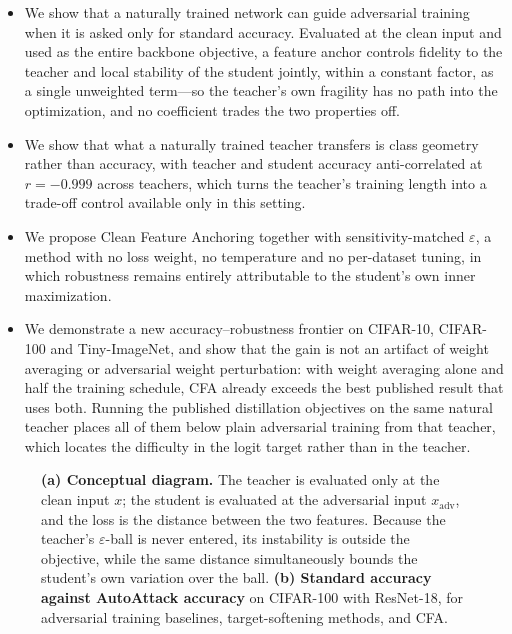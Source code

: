 \begin{itemize}
  \item We show that a naturally trained network can guide adversarial training when it is asked
    only for standard accuracy. Evaluated at the clean input and used as the entire backbone
    objective, a feature anchor controls fidelity to the teacher and local stability of the student
    jointly, within a constant factor, as a single unweighted term---so the teacher's own fragility
    has no path into the optimization, and no coefficient trades the two properties off.

  \item We show that what a naturally trained teacher transfers is class geometry rather than
    accuracy, with teacher and student accuracy anti-correlated at $r = -0.999$ across teachers,
    which turns the teacher's training length into a trade-off control available only in this
    setting.

  \item We propose Clean Feature Anchoring together with sensitivity-matched $\varepsilon$, a method
    with no loss weight, no temperature and no per-dataset tuning, in which robustness remains
    entirely attributable to the student's own inner maximization.

  \item We demonstrate a new accuracy--robustness frontier on CIFAR-10, CIFAR-100 and Tiny-ImageNet,
    and show that the gain is not an artifact of weight averaging or adversarial weight perturbation:
    with weight averaging alone and half the training schedule, CFA already exceeds the best
    published result that uses both. Running the published distillation objectives on the same
    natural teacher places all of them below plain adversarial training from that teacher, which
    locates the difficulty in the logit target rather than in the teacher.
\end{itemize}

\begin{figure}[t]
  \centering
  \caption{\textbf{(a) Conceptual diagram.} The teacher is evaluated only at the clean input $x$; the
  student is evaluated at the adversarial input $x_{\mathrm{adv}}$, and the loss is the distance
  between the two features. Because the teacher's $\varepsilon$-ball is never entered, its
  instability is outside the objective, while the same distance simultaneously bounds the student's
  own variation over the ball. \textbf{(b) Standard accuracy against AutoAttack accuracy} on
  CIFAR-100 with ResNet-18, for adversarial training baselines, target-softening methods, and CFA.}
  \label{fig:teaser}
\end{figure}
